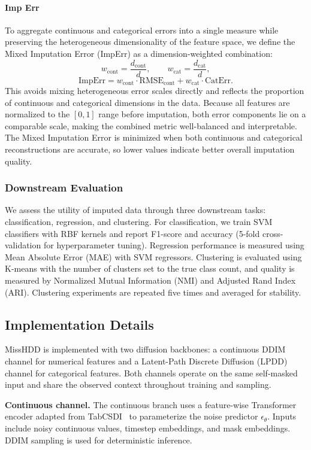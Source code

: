 \documentclass[times, review, 10pt]{elsarticle}
\begin{document}
\paragraph{Imp Err}
To aggregate continuous and categorical errors into a single measure while
preserving the heterogeneous dimensionality of the feature space, we define
the Mixed Imputation Error (ImpErr) as a dimension-weighted combination:
\[
w_{\mathrm{cont}} = \frac{d_{\mathrm{cont}}}{d},
\qquad
w_{\mathrm{cat}} = \frac{d_{\mathrm{cat}}}{d},
\]
\[
\mathrm{ImpErr}
=
w_{\mathrm{cont}} \cdot \mathrm{RMSE}_{\mathrm{cont}}
+
w_{\mathrm{cat}} \cdot \mathrm{CatErr}.
\]
This avoids mixing heterogeneous error scales directly and reflects the proportion of continuous and categorical dimensions in the data. Because all features are normalized to the \([0,1]\) range before imputation, both error
components lie on a comparable scale, making the combined metric
well-balanced and interpretable. The Mixed Imputation Error is minimized when both continuous and categorical reconstructions are accurate, so lower values indicate better overall imputation quality.


\subsubsection{Downstream Evaluation}

We assess the utility of imputed data through three downstream tasks:
classification, regression, and clustering. For classification, we train SVM
classifiers with RBF kernels and report F1-score and accuracy (5-fold
cross-validation for hyperparameter tuning). Regression performance is
measured using Mean Absolute Error (MAE) with SVM regressors. Clustering is
evaluated using K-means with the number of clusters set to the true class
count, and quality is measured by Normalized Mutual Information (NMI) and
Adjusted Rand Index (ARI). Clustering experiments are repeated five times
and averaged for stability.
\subsection{Implementation Details}

MissHDD is implemented with two diffusion backbones: a continuous DDIM
channel for numerical features and a Latent-Path Discrete Diffusion (LPDD)
channel for categorical features. Both channels operate on the same
self-masked input and share the observed context throughout training and
sampling.

\textbf{Continuous channel.}
The continuous branch uses a feature-wise Transformer encoder adapted from
TabCSDI~\cite{tabcsdi} to parameterize the noise predictor
$\epsilon_\theta$. Inputs include noisy continuous values, timestep
embeddings, and mask embeddings. DDIM sampling is used for deterministic
inference.
\end{document}
